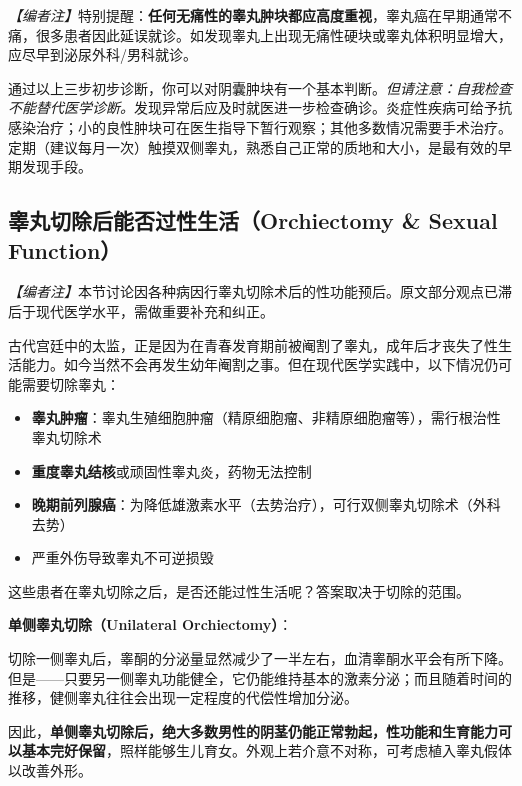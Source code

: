 \noindent\textit{【编者注】}特别提醒：\textbf{任何无痛性的睾丸肿块都应高度重视}，睾丸癌在早期通常不痛，很多患者因此延误就诊。如发现睾丸上出现无痛性硬块或睾丸体积明显增大，应尽早到泌尿外科/男科就诊。

\begin{tcolorbox}[colback=pink!5!white,colframe=red!50!black,title=贴心小叮咛]
通过以上三步初步诊断，你可以对阴囊肿块有一个基本判断。\textit{但请注意：自我检查不能替代医学诊断。}发现异常后应及时就医进一步检查确诊。炎症性疾病可给予抗感染治疗；小的良性肿块可在医生指导下暂行观察；其他多数情况需要手术治疗。定期（建议每月一次）触摸双侧睾丸，熟悉自己正常的质地和大小，是最有效的早期发现手段。
\end{tcolorbox}

\subsection{睾丸切除后能否过性生活（Orchiectomy & Sexual Function）}

\noindent\textit{【编者注】}本节讨论因各种病因行睾丸切除术后的性功能预后。原文部分观点已滞后于现代医学水平，需做重要补充和纠正。

\vspace{0.5em}
古代宫廷中的太监，正是因为在青春发育期前被阉割了睾丸，成年后才丧失了性生活能力。如今当然不会再发生幼年阉割之事。但在现代医学实践中，以下情况仍可能需要切除睾丸：
\begin{itemize}
	\item \textbf{睾丸肿瘤}：睾丸生殖细胞肿瘤（精原细胞瘤、非精原细胞瘤等），需行根治性睾丸切除术
	\item \textbf{重度睾丸结核}或顽固性睾丸炎，药物无法控制
	\item \textbf{晚期前列腺癌}：为降低雄激素水平（去势治疗），可行双侧睾丸切除术（外科去势）
	\item 严重外伤导致睾丸不可逆损毁
\end{itemize}
这些患者在睾丸切除之后，是否还能过性生活呢？答案取决于切除的范围。

\vspace{0.5em}
\noindent\textbf{单侧睾丸切除（Unilateral Orchiectomy）}：

切除一侧睾丸后，睾酮的分泌量显然减少了一半左右，血清睾酮水平会有所下降。但是——只要另一侧睾丸功能健全，它仍能维持基本的激素分泌；而且随着时间的推移，健侧睾丸往往会出现一定程度的代偿性增加分泌。

因此，\textbf{单侧睾丸切除后，绝大多数男性的阴茎仍能正常勃起，性功能和生育能力可以基本完好保留}，照样能够生儿育女。外观上若介意不对称，可考虑植入睾丸假体以改善外形。

